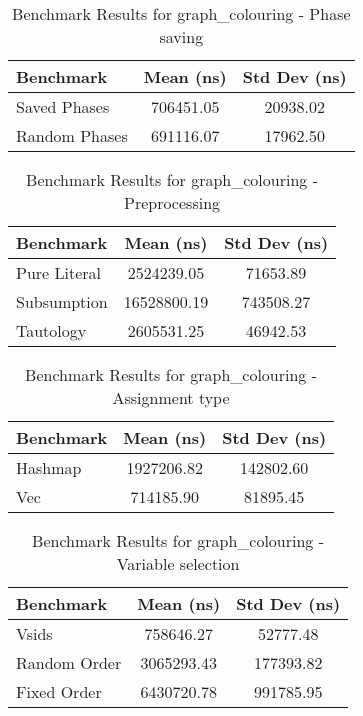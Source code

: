 \begin{table}[h]
    \centering
    \caption{Benchmark Results for graph_colouring - Phase saving}
    \begin{tabular}{|l|c|c|}
        \hline
        Benchmark & Mean (ns) & Std Dev (ns) \\
        \hline
        Saved Phases & 706451.05 & 20938.02 \\
        Random Phases & 691116.07 & 17962.50 \\
        \hline
    \end{tabular}
\end{table}


\begin{table}[h]
    \centering
    \caption{Benchmark Results for graph_colouring - Preprocessing}
    \begin{tabular}{|l|c|c|}
        \hline
        Benchmark & Mean (ns) & Std Dev (ns) \\
        \hline
        Pure Literal & 2524239.05 & 71653.89 \\
        Subsumption & 16528800.19 & 743508.27 \\
        Tautology & 2605531.25 & 46942.53 \\
        \hline
    \end{tabular}
\end{table}


\begin{table}[h]
    \centering
    \caption{Benchmark Results for graph_colouring - Assignment type}
    \begin{tabular}{|l|c|c|}
        \hline
        Benchmark & Mean (ns) & Std Dev (ns) \\
        \hline
        Hashmap & 1927206.82 & 142802.60 \\
        Vec & 714185.90 & 81895.45 \\
        \hline
    \end{tabular}
\end{table}


\begin{table}[h]
    \centering
    \caption{Benchmark Results for graph_colouring - Variable selection}
    \begin{tabular}{|l|c|c|}
        \hline
        Benchmark & Mean (ns) & Std Dev (ns) \\
        \hline
        Vsids & 758646.27 & 52777.48 \\
        Random Order & 3065293.43 & 177393.82 \\
        Fixed Order & 6430720.78 & 991785.95 \\
        \hline
    \end{tabular}
\end{table}


